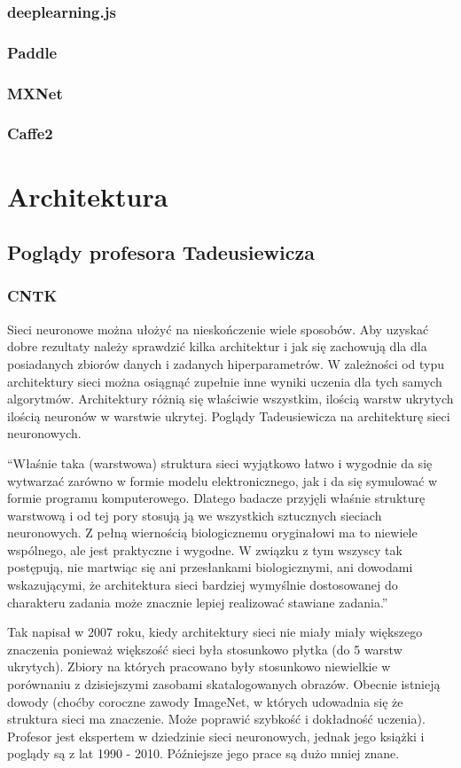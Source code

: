 \documentclass[a4paper,twoside,titlepage,openright]{book}
\begin{document}
\subsection{deeplearning.js}
\subsection{Paddle}
\subsection{MXNet}
\subsection{Caffe2}

\chapter{Architektura}
\section{Poglądy profesora Tadeusiewicza}
\subsection{CNTK}
Sieci neuronowe można ułożyć na nieskończenie wiele sposobów. Aby uzyskać dobre rezultaty należy sprawdzić kilka architektur i jak się zachowują dla dla posiadanych zbiorów danych i zadanych hiperparametrów.
W zależności od typu architektury sieci można osiągnąć zupełnie inne wyniki uczenia dla tych samych algorytmów. 
Architektury różnią się właściwie wszystkim, ilością warstw ukrytych ilością neuronów w warstwie ukrytej. 
Poglądy Tadeusiewicza na architekturę sieci neuronowych.

“Właśnie taka (warstwowa) struktura sieci wyjątkowo łatwo i wygodnie da się wytwarzać zarówno w formie modelu elektronicznego, jak i da się symulować w formie programu komputerowego. Dlatego badacze przyjęli właśnie strukturę warstwową i od tej pory stosują ją we wszystkich sztucznych sieciach neuronowych. Z pełną wiernością biologicznemu oryginałowi ma to niewiele wspólnego, ale jest praktyczne i wygodne. W związku z tym wszyscy tak postępują, nie martwiąc się ani przesłankami biologicznymi, ani dowodami wskazującymi, że architektura sieci bardziej wymyślnie dostosowanej do charakteru zadania może znacznie lepiej realizować stawiane zadania.”

Tak napisał w 2007 roku, kiedy architektury sieci nie miały miały większego znaczenia ponieważ większość sieci była stosunkowo płytka (do 5 warstw ukrytych). Zbiory na których pracowano były stosunkowo niewielkie w porównaniu z dzisiejszymi zasobami skatalogowanych obrazów. 
Obecnie istnieją dowody (choćby coroczne zawody ImageNet, w których udowadnia się że struktura sieci ma znaczenie. Może poprawić szybkość i dokładność uczenia). Profesor jest ekspertem w dziedzinie sieci neuronowych, jednak jego książki i poglądy są z lat 1990 - 2010. Późniejsze jego prace są dużo mniej znane.
\end{document}
